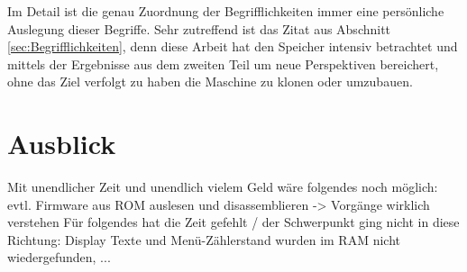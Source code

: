 Im Detail ist die genau Zuordnung der Begrifflichkeiten immer eine persönliche Auslegung dieser Begriffe.
Sehr zutreffend ist das Zitat aus Abschnitt \ref{sec:Begrifflichkeiten}, denn diese Arbeit hat den Speicher intensiv betrachtet und mittels der Ergebnisse aus dem zweiten Teil um neue Perspektiven bereichert, ohne das Ziel verfolgt zu haben die Maschine zu klonen oder umzubauen.

\section{Ausblick}
Mit unendlicher Zeit und unendlich vielem Geld wäre folgendes noch möglich: evtl. Firmware aus ROM auslesen und disassemblieren -> Vorgänge wirklich verstehen
Für folgendes hat die Zeit gefehlt / der Schwerpunkt ging nicht in diese Richtung: Display Texte und Menü-Zählerstand wurden im RAM nicht wiedergefunden, ...
